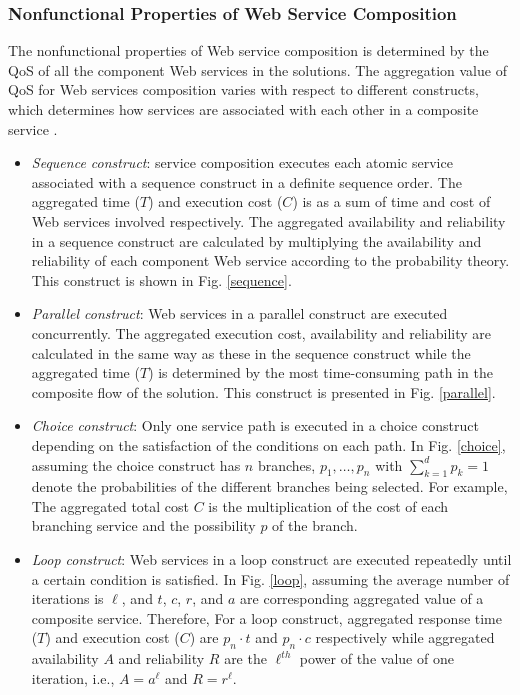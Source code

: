\subsubsection{Nonfunctional Properties of Web Service Composition}
The nonfunctional properties of Web service composition is determined by the QoS of all the component Web services in the solutions. The aggregation value of QoS for Web services composition varies with respect to different constructs, which determines how services are associated with each other in a composite service \cite{zeng2003quality}.
\begin{itemize}

\item \emph{Sequence construct}: service composition executes each atomic service associated with a sequence construct in a definite sequence order. The aggregated time ($T$) and execution cost ($C$) is as a sum of time and cost of Web services involved respectively. The aggregated availability and reliability in a sequence construct are calculated by multiplying the availability and reliability of each component Web service according to the probability theory. This construct is shown in Fig. \ref{sequence}.
\item \emph{Parallel construct}: Web services in a parallel construct are executed concurrently. The aggregated execution cost, availability and reliability are calculated in the same way as these in the sequence construct while the aggregated time ($T$) is determined by the most time-consuming path in the composite flow of the solution. This construct is presented in Fig. \ref{parallel}.
\item \emph{Choice construct}: Only one service path is executed in a choice construct depending on the satisfaction of the conditions on each path. In Fig. \ref{choice}, assuming the choice construct has $n$ branches, $p_1,\ldots, p_n$ with  $\sum\limits^d_{k=1}p_k=1$ denote the probabilities of the different branches being selected. For example, The aggregated total cost $C$  is the multiplication of the cost of each branching service and the possibility $p$ of the branch.
\item \emph{Loop construct}: Web services in a loop construct are executed repeatedly until a certain condition is satisfied. In Fig. \ref{loop}, assuming the average number of iterations is $\ell$, and $t$, $c$, $r$, and $a$ are corresponding aggregated value of a composite service. Therefore, For a loop construct, aggregated response time ($T$) and execution cost ($C$) are $p_n \cdot t$ and $p_n \cdot c$ respectively while aggregated availability $A$ and reliability $R$ are the $\ell^{th}$ power of the value of one iteration, i.e., $A=a^\ell$ and $R=r^\ell$.
\end{itemize}


